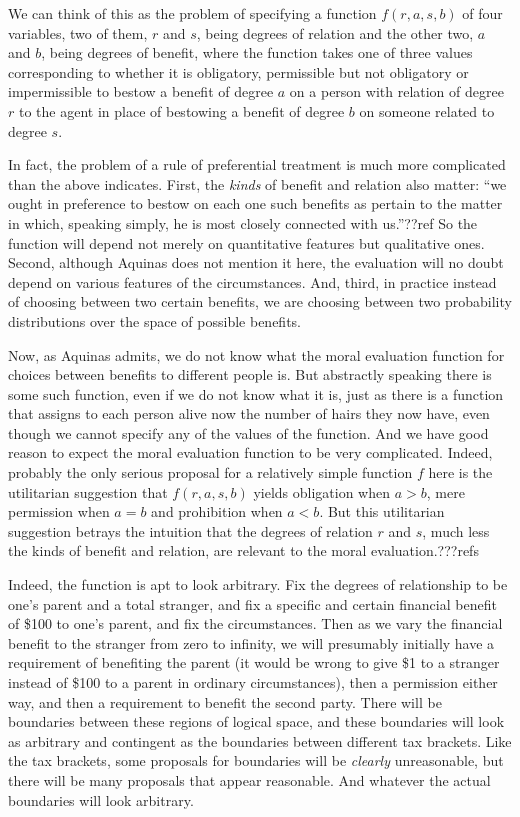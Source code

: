 We can think of this as the problem of specifying a function $f(r,a,s,b)$ of four variables, two of them, $r$ and $s$, being
degrees of relation and the other two, $a$ and $b$, being degrees of benefit, where the function takes one of three values
corresponding to whether it is obligatory, permissible but not obligatory or impermissible to bestow a benefit of degree $a$ on a person with
relation of degree $r$ to the agent in place of bestowing a benefit of degree $b$ on someone related to degree $s$. 

In fact, the problem of a rule of preferential treatment is much more complicated than the above indicates. First, the \textit{kinds} of benefit and relation also matter: ``we ought in preference 
to bestow on each one such benefits as pertain to the matter in which, speaking simply, he is most closely connected with us.''??ref
So the function will depend not merely on quantitative features but qualitative ones. Second, although Aquinas does not mention it here,
the evaluation will no doubt depend on various features of the circumstances. And, third, in practice instead of choosing between
two certain benefits, we are choosing between two probability distributions over the space of possible benefits.

Now, as Aquinas admits, we do not know what the moral evaluation function for choices between benefits to different people is.
But abstractly speaking there is some such function, even if we do not know what it is, just as there is a function that assigns to each person
alive now the number of hairs they now have, even though we cannot specify any of the values of the function.
And we have good reason to expect the moral evaluation function to be very complicated. Indeed, probably the only serious proposal for a
relatively simple function $f$ here is the utilitarian suggestion that $f(r,a,s,b)$ yields obligation when $a>b$,
mere permission when $a=b$ and prohibition when $a<b$. But this utilitarian suggestion betrays the intuition that
the degrees of relation $r$ and $s$, much less the kinds of benefit and relation, are relevant to the moral evaluation.???refs

Indeed, the function is apt to look arbitrary. Fix the degrees of relationship to be one's parent and a total stranger,
and fix a specific and certain financial benefit of \$100 to one's parent, and fix the circumstances. Then as we vary the 
financial benefit to the stranger from zero to infinity, we will presumably initially have a requirement of benefiting the parent
(it would be wrong to give \$1 to a stranger instead of \$100 to a parent in ordinary circumstances), 
then a permission either way, and then a requirement to benefit the second party. There will be boundaries between these regions
of logical space, and these boundaries will look as arbitrary and contingent as the boundaries between different tax brackets.
Like the tax brackets, some proposals for boundaries will be \textit{clearly} unreasonable, but there will be many proposals
that appear reasonable. And whatever the actual boundaries will look arbitrary.

